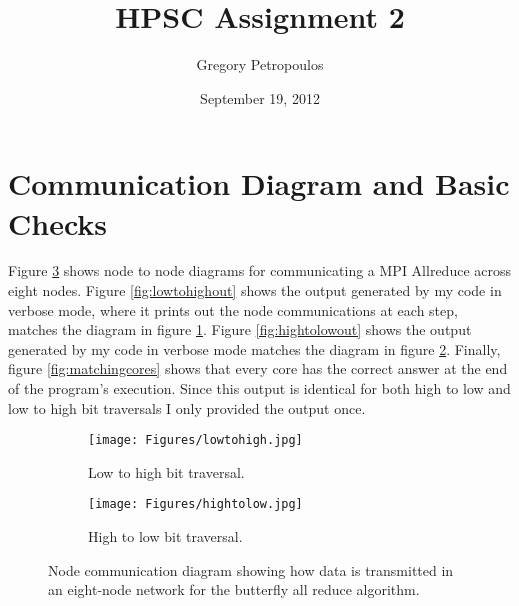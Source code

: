 \documentclass[11pt,a4paper,oneside]{report}
\begin{document}
\title{HPSC Assignment 2}
\author{Gregory Petropoulos}
\date{September 19, 2012}
\maketitle

\section{Communication Diagram and Basic Checks}

Figure \ref{fig:nodecomm} shows node to node diagrams for communicating a MPI Allreduce across eight nodes.  Figure \ref{fig:lowtohighout} shows the output generated by my code in verbose mode, where it prints out the node communications at each step, matches the diagram in figure \ref{fig:lowtohigh}.  Figure \ref{fig:hightolowout} shows the output generated by my code in verbose mode matches the diagram in figure \ref{fig:hightolow}.  Finally, figure \ref{fig:matchingcores} shows that every core has the correct answer at the end of the program's execution.  Since this output is identical for both high to low and low to high bit traversals I only provided the output once.

\begin{figure}[htpb]
  \centering
  \begin{subfigure}[b]{2.4in}
    \centering
    \texttt{[image: Figures/lowtohigh.jpg]}
    \caption{Low to high bit traversal.}
    \label{fig:lowtohigh}
  \end{subfigure}
  \begin{subfigure}[b]{2.4in}
    \centering
    \texttt{[image: Figures/hightolow.jpg]}
    \caption{High to low bit traversal.}
    \label{fig:hightolow}
  \end{subfigure}
  \caption{Node communication diagram showing how data is transmitted in an eight-node network for the butterfly all reduce algorithm.}\label{fig:nodecomm}
\end{figure}
\end{document}
